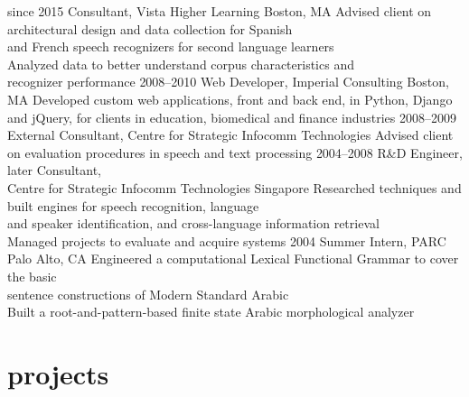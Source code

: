 \documentclass[]{friggeri-cv}
\begin{document}
\begin{entrylist}
  \entry
    {since 2015}
    {Consultant, Vista Higher Learning}
    {Boston, MA}
    {
     \Squaredot Advised client on architectural design and data collection for Spanish \\
     \hspace*{3pt} and French speech recognizers for second language learners \\
     \Squaredot Analyzed data to better understand corpus characteristics and \\
     \hspace*{3pt} recognizer performance
    }
  \entry
    {2008--2010}
    {Web Developer, Imperial Consulting}
    {Boston, MA}
    {
     \Squaredot Developed custom web applications, front and back end, in Python, Django \\ 
     \hspace*{3pt} and jQuery, for clients in education, biomedical and finance industries
    }
  \entry
    {2008--2009}
    {External Consultant, Centre for Strategic Infocomm Technologies}
    {}
    {\Squaredot Advised client on evaluation procedures in speech and text processing}
  \entry
    {2004--2008}
    {R\&D Engineer, later Consultant, \\ Centre for Strategic Infocomm Technologies}
    {Singapore}
    {\Squaredot Researched techniques and built engines for speech recognition, language \\
    \hspace*{3pt} and speaker identification, and cross-language information retrieval \\
    \Squaredot Managed projects to evaluate and acquire systems}
  \entry
    {2004}
    {Summer Intern, PARC}
    {Palo Alto, CA}
    {\Squaredot Engineered a computational Lexical Functional Grammar to cover the basic \\
     \hspace*{3pt} sentence constructions of Modern Standard Arabic \\
	\Squaredot Built a root-and-pattern-based finite state Arabic morphological analyzer}
\end{entrylist}

\section{projects}
\end{document}
